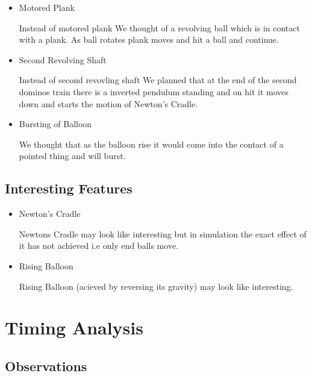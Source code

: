 \documentclass[a4paper,11pt]{article}
\begin{document}
\begin{itemize}
\item {Motored Plank}
\begin{description} Instead of motored plank We thought of a revolving ball which is in contact with a plank. As ball rotates plank moves and hit a ball and continue.
\end{description}

\item {Second Revolving Shaft}
\begin{description} Instead of second revovling shaft We planned that at the end of the second dominos train there is a inverted pendulum standing and on hit it moves down and starts the motion of Newton's Cradle.
\end{description}

\item{Bursting of Balloon}
\begin{description} We thought that as the balloon rise it would come into the contact of a pointed thing and will burst.
\end{description}
\end{itemize}

\subsection{Interesting Features}
\begin{itemize}
\item {Newton's Cradle}
\begin{description} Newtons Cradle may look like interesting but in simulation the exact effect of it has not achieved i.e only end balls move.
\end{description}

\item {Rising Balloon}
\begin{description} Rising Balloon (acieved by reversing its gravity) may look like interesting.
\end{description}
\end{itemize}


\section{Timing Analysis}

\subsection{Observations}
\end{document}
